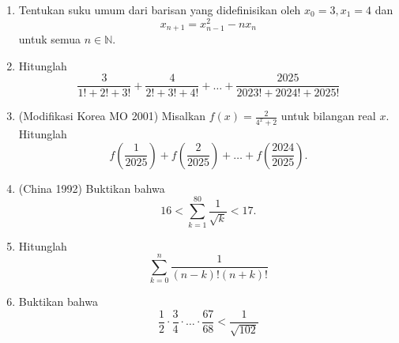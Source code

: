 \documentclass[12pt]{scrartcl}
\begin{document}
\begin{enumerate}
    \item Tentukan suku umum dari barisan yang didefinisikan oleh $x_0 = 3, x_1 = 4$ dan
    \[ x_{n+1} = x_{n-1}^2 - n x_n \]
    untuk semua $n \in \mathbb{N}$.

    \item Hitunglah
    \[ \frac{3}{1! + 2! + 3!} + \frac{4}{2! + 3! + 4!} + \dots + \frac{2025}{2023! + 2024! + 2025!} \]

    \item (Modifikasi Korea MO 2001) Misalkan $f(x) = \frac{2}{4^x + 2}$ untuk bilangan real $x$.
    Hitunglah
    \[ f\left(\frac{1}{2025}\right) + f\left(\frac{2}{2025}\right) + \dots + f\left(\frac{2024}{2025}\right). \]

    \item (China 1992) Buktikan bahwa
    \[ 16 < \sum_{k=1}^{80} \frac{1}{\sqrt{k}} < 17. \]

    \item Hitunglah
    \[ \sum_{k=0}^{n} \frac{1}{(n-k)!(n+k)!} \]

    \item Buktikan bahwa
    \[ \frac{1}{2} \cdot \frac{3}{4} \cdot \ldots \cdot\frac{67}{68} < \frac{1}{\sqrt{102}}\]
\end{enumerate}
\end{document}
